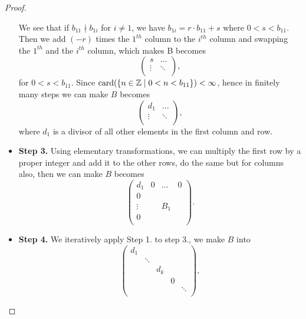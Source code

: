 \begin{proof}
\begin{itemize}
		      \par We see that if \(b_{11}\nmid b_{1i}\) for \(i \neq 1\), we have \(b_{1i} = r\cdot b_{11} + s\) where \(0 < s < b_{11}\). Then we add \((-r)\) times the
		      \(1^{th} \) column to the \(i^{th} \) column and swapping the \(1^{th} \) and the \(i^{th} \) column, which makes B becomes
		      \[
			      \begin{pmatrix}
				      s      & \ldots \\
				      \vdots & \ddots \\
			      \end{pmatrix},
		      \]
		      for \(0 < s< b_{11} \). Since \(\mathrm{card}(\left\{n\in \mathbb{\MakeUppercase{z}} \mid 0 < n <b_{11} \right\}) < \infty \), hence in finitely many steps we can make
		      \(B\) becomes
		      \[
			      \begin{pmatrix}
				      d_1    & \ldots \\
				      \vdots & \ddots \\
			      \end{pmatrix},
		      \]
		      where \(d_1\) is a divisor of all other elements in the first column and row.
		\item \textbf{Step 3.} Using elementary transformations, we can multiply the first row by a proper integer and add it to the other rows, do the same but for columns also, then we can
		      make \(B\) becomes
		      \[
			      \begin{pmatrix}
				      d_1    & 0 & \ldots & 0 \\
				      0      &   &        &   \\
				      \vdots &   & B_1    &   \\
				      0      &   &        &   \\
			      \end{pmatrix}.
		      \]
		\item \textbf{Step 4.} We iteratively apply Step 1. to step 3., we make \(B\) into
		      \[
			      \begin{pmatrix}
				      d_1 &        &       &   &        \\
				          & \ddots &       &   &        \\
				          &        & d_{k} &   &        \\
				          &        &       & 0 &        \\
				          &        &       &   & \ddots \\
			      \end{pmatrix},
\]
\end{itemize}
\end{proof}
